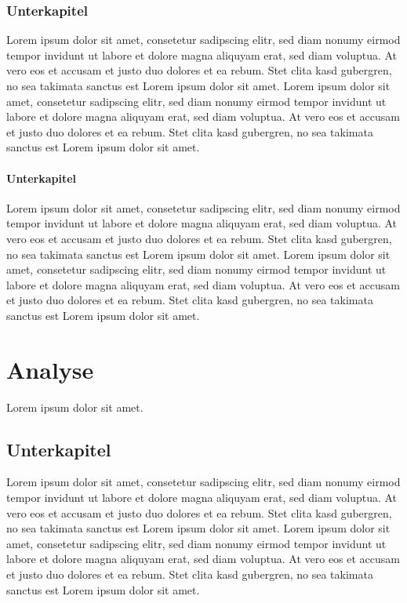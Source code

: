 \documentclass[a4paper,12pt,bibliography=totoc]{scrreprt}
\begin{document}
\subsection{Unterkapitel}
\label{subsec:uu1}
Lorem ipsum dolor sit amet, consetetur sadipscing elitr, sed diam nonumy eirmod tempor invidunt ut labore et dolore magna aliquyam erat, sed diam voluptua. At vero eos et accusam et justo duo dolores et ea rebum. Stet clita kasd gubergren, no sea takimata sanctus est Lorem ipsum dolor sit amet. Lorem ipsum dolor sit amet, consetetur sadipscing elitr, sed diam nonumy eirmod tempor invidunt ut labore et dolore magna aliquyam erat, sed diam voluptua. At vero eos et accusam et justo duo dolores et ea rebum. Stet clita kasd gubergren, no sea takimata sanctus est Lorem ipsum dolor sit amet.

\subsubsection{Unterkapitel}
\label{subsubsec:uuu1}
Lorem ipsum dolor sit amet, consetetur sadipscing elitr, sed diam nonumy eirmod tempor invidunt ut labore et dolore magna aliquyam erat, sed diam voluptua. At vero eos et accusam et justo duo dolores et ea rebum. Stet clita kasd gubergren, no sea takimata sanctus est Lorem ipsum dolor sit amet. Lorem ipsum dolor sit amet, consetetur sadipscing elitr, sed diam nonumy eirmod tempor invidunt ut labore et dolore magna aliquyam erat, sed diam voluptua. At vero eos et accusam et justo duo dolores et ea rebum. Stet clita kasd gubergren, no sea takimata sanctus est Lorem ipsum dolor sit amet.


\chapter{Analyse}
\label{chap:analyse}
Lorem ipsum dolor sit amet.

\section{Unterkapitel}
\label{sec:u4}
Lorem ipsum dolor sit amet, consetetur sadipscing elitr, sed diam nonumy eirmod tempor invidunt ut labore et dolore magna aliquyam erat, sed diam voluptua. At vero eos et accusam et justo duo dolores et ea rebum. Stet clita kasd gubergren, no sea takimata sanctus est Lorem ipsum dolor sit amet. Lorem ipsum dolor sit amet, consetetur sadipscing elitr, sed diam nonumy eirmod tempor invidunt ut labore et dolore magna aliquyam erat, sed diam voluptua. At vero eos et accusam et justo duo dolores et ea rebum. Stet clita kasd gubergren, no sea takimata sanctus est Lorem ipsum dolor sit amet.
\end{document}

